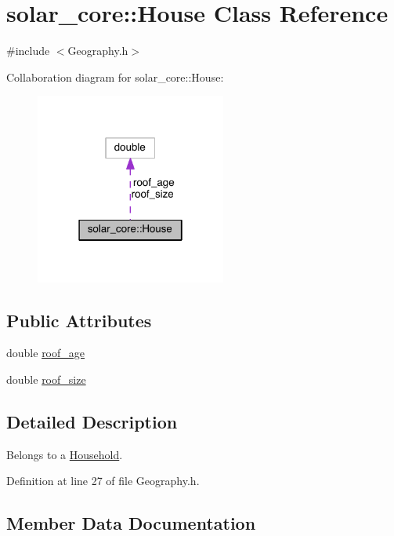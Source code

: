 \hypertarget{classsolar__core_1_1_house}{}\section{solar\+\_\+core\+:\+:House Class Reference}
\label{classsolar__core_1_1_house}


{\ttfamily \#include $<$Geography.\+h$>$}



Collaboration diagram for solar\+\_\+core\+:\+:House\+:
\nopagebreak
\begin{figure}[H]
\begin{center}
\leavevmode
\includegraphics[width=178pt]{classsolar__core_1_1_house__coll__graph}
\end{center}
\end{figure}
\subsection*{Public Attributes}
\begin{DoxyCompactItemize}
\item 
double \hyperlink{classsolar__core_1_1_house_aa6491ce4f3fc6d99a59ea80cfb8194fc}{roof\+\_\+age}
\item 
double \hyperlink{classsolar__core_1_1_house_a7f872cb768b83e70e263590078fa4c7d}{roof\+\_\+size}
\end{DoxyCompactItemize}


\subsection{Detailed Description}
Belongs to a \hyperlink{classsolar__core_1_1_household}{Household}. 

Definition at line 27 of file Geography.\+h.



\subsection{Member Data Documentation}
\hypertarget{classsolar__core_1_1_house_aa6491ce4f3fc6d99a59ea80cfb8194fc}{}
